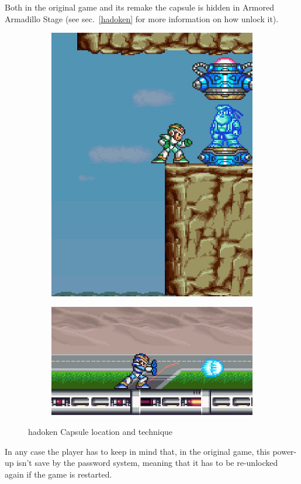 \begin{itemize}
	Both in the original game and its remake the capsule is hidden in Armored Armadillo Stage (see sec.~\ref{hadoken} for more information on how unlock it).
	\begin{figure}[htp]
		\centering
		\begin{subfigure}{0.3\linewidth}
			\centering
			\includegraphics[width=\textwidth]{figures/X1/Armored_armadillo/Armadillo_hadoken.jpg}
		\end{subfigure}
		\begin{subfigure}{0.5\linewidth}
			\centering
			\includegraphics[width=\textwidth]{figures/X1/weapons/hadoken.jpg}
		\end{subfigure}
		\caption{hadoken Capsule location and technique}
	\end{figure}
	In any case the player has to keep in mind that, in the original game, this power-up isn't save by the password system, meaning that it has to be re-unlocked again if the game is restarted.
\end{itemize}

